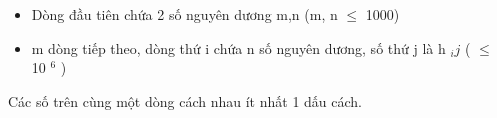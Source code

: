 \begin{itemize}
	\item Dòng đầu tiên chứa 2 số nguyên dương m,n (m, n  $\le$ 1000)
	\item m dòng tiếp theo, dòng thứ i chứa n số nguyên dương, số thứ j là h $_ ij $ ( $\le$ 10 $^ 6 $ )
\end{itemize}

Các số trên cùng một dòng cách nhau ít nhất 1 dấu cách.

\